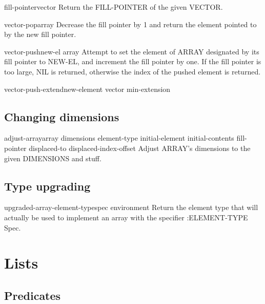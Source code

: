 \documentclass[10pt,english]{book}
\begin{document}
\begin{accessor}{fill-pointer}{vector}
  Return the FILL-POINTER of the given VECTOR.
\end{accessor}

\begin{function}{vector-pop}{array}
  Decrease the fill pointer by 1 and return the element pointed to by the
  new fill pointer.
\end{function}

\begin{function}{vector-push}{new-el array}
  Attempt to set the element of ARRAY designated by its fill pointer
   to NEW-EL, and increment the fill pointer by one. If the fill pointer is
   too large, NIL is returned, otherwise the index of the pushed element is
   returned.
\end{function}

\begin{function}{vector-push-extend}{new-element vector \op min-extension}
  
\end{function}

\section{Changing dimensions}
\label{sec:changing-dimensions}

\begin{function}{adjust-array}{array dimensions \key element-type initial-element initial-contents
 fill-pointer displaced-to displaced-index-offset}
  Adjust ARRAY's dimensions to the given DIMENSIONS and stuff.
\end{function}

\section{Type upgrading}
\label{sec:type-upgrading}

\begin{function}{upgraded-array-element-type}{spec \op environment}
  Return the element type that will actually be used to implement an array
   with the specifier :ELEMENT-TYPE Spec.
\end{function}


\chapter{Lists}
\label{cha:lists}

\section{Predicates}
\label{sec:list-predicates}
\end{document}
